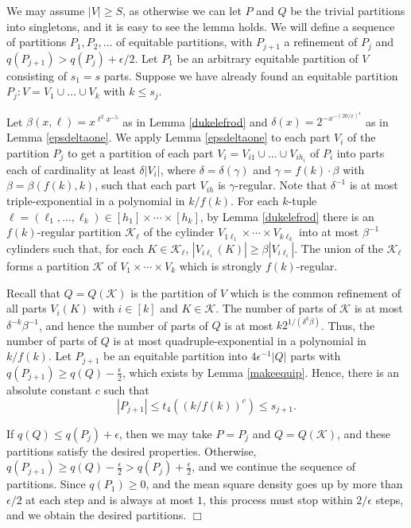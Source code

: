 \documentclass[11pt]{article}
\newenvironment{proof}
      {\medskip\noindent{\bf Proof:}\hspace{1mm}}
      {\hfill$\Box$\medskip}
\begin{document}
\begin{proof}
We may assume $|V| \geq S$, as otherwise we can let $P$ and $Q$ be the trivial
partitions into singletons, and it is easy to see the lemma holds.
We will define a sequence of partitions $P_1,P_2,\ldots$ of equitable partitions,
with $P_{j+1}$ a refinement of $P_j$ and $q(P_{j+1}) > q(P_j)+\epsilon/2$. Let
$P_1$ be an arbitrary equitable partition of $V$ consisting of $s_1=s$ parts. Suppose we
have already found an equitable partition $P_j:V=V_1 \cup \ldots \cup V_k$ with
$k \leq s_{j}$.

Let $\beta(x,\ell)=x^{\ell^2x^{-5}}$ as in Lemma \ref{dukelefrod} and
$\delta(x)=2^{-x^{-(20/x)^4}}$ as in Lemma \ref{epsdeltaone}. We apply Lemma
\ref{epsdeltaone} to each part $V_i$ of the partition $P_j$ to get a partition
of each part $V_i=V_{i1} \cup \ldots \cup V_{ih_i}$ of $P_i$ into parts each of
cardinality at least $\delta|V_i|$, where $\delta=\delta(\gamma)$ and
$\gamma=f(k) \cdot \beta$ with $\beta=\beta(f(k),k)$, such that each part $V_{ih}$ is
$\gamma$-regular. Note that $\delta^{-1}$ is at most triple-exponential in a
polynomial in $k/f(k)$. For each $k$-tuple $\ell=(\ell_1,\ldots,\ell_k) \in
[h_1] \times \cdots \times [h_k]$,  by Lemma \ref{dukelefrod} there is an
$f(k)$-regular partition $\mathcal{K}_{\ell}$ of the cylinder $V_{1\ell_1}
\times \cdots \times V_{k\ell_k}$ into at most $\beta^{-1}$ cylinders such
that, for each $K \in \mathcal{K}_{\ell}$, $|V_{i\ell_i}(K)| \geq \beta
|V_{i\ell_i}|$.   The union of the $\mathcal{K}_{\ell}$ forms a partition
$\mathcal{K}$  of $V_1 \times \cdots \times V_k$ which is strongly
$f(k)$-regular.

Recall that $Q=Q(\mathcal{K})$ is the partition of $V$ which is the common refinement of all
parts $V_i(K)$ with $i \in [k]$ and $K \in \mathcal{K}$. The number of parts of
$\mathcal{K}$ is at most $\delta^{-k}\beta^{-1}$, and hence the number of parts
of $Q$ is at most $k2^{1/(\delta^k \beta)}$. Thus, the number of parts of $Q$
is at most quadruple-exponential in a polynomial in $k/f(k)$. Let $P_{j+1}$ be
an equitable partition into $4\epsilon^{-1}|Q|$ parts with
$q(P_{j+1}) \geq q(Q)-\frac{\epsilon}{2}$, which exists by Lemma
\ref{makeequip}. Hence, there is an absolute constant $c$ such that
$$|P_{j+1}| \leq t_4\left((k/f(k))^c\right) \leq s_{j+1}.$$

If $q(Q) \leq q(P_j)+\epsilon$, then we may take $P=P_j$ and
$Q=Q(\mathcal{K})$, and these partitions satisfy the desired properties.
Otherwise, $q(P_{j+1}) \geq q(Q)-\frac{\epsilon}{2} >
q(P_j)+\frac{\epsilon}{2}$, and we continue the sequence of partitions. Since
$q(P_1) \geq 0$, and the mean square density goes up by more than $\epsilon/2$
at each step and is always at most $1$, this process must stop within
$2/\epsilon$ steps, and we obtain the desired partitions.
\end{proof}
\end{document}
